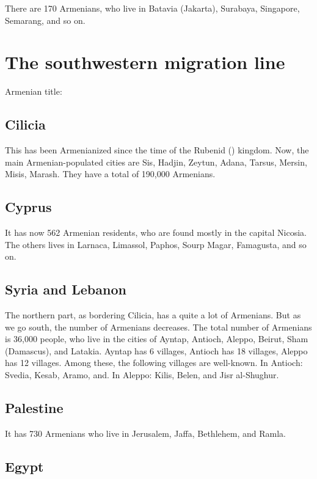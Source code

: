 There are 170 Armenians, who live in Batavia (Jakarta), Surabaya, Singapore, Semarang, and so on. 

\section{The southwestern migration line}

Armenian title: 


\subsection{Cilicia}

This has been Armenianized since the time of the Rubenid () kingdom. Now, the main Armenian-populated cities are Sis, Hadjin, Zeytun, Adana, Tarsus, Mersin, Misis, Marash. They have a total of 190,000 Armenians.

\subsection{Cyprus}

It has now 562 Armenian residents, who are found mostly in the capital Nicosia. The others lives in Larnaca, Limassol, Paphos, Sourp Magar, Famagusta, and so on. 

\subsection{Syria and Lebanon}

The northern part, as bordering Cilicia, has a quite a lot of Armenians. But as we go south, the number of Armenians decreases. The total number of Armenians is 36,000 people, who live in the cities of Ayntap, Antioch, Aleppo, Beirut, Sham (Damascus), and Latakia. Ayntap has 6 villages, Antioch has 18 villages, Aleppo has 12 villages. Among these, the following villages are well-known. In Antioch: Svedia, Kesab, Aramo, and. In Aleppo: Kilis, Belen, and Jisr al-Shughur.

\subsection{Palestine}
It has 730 Armenians who live in Jerusalem, Jaffa, Bethlehem, and Ramla. 

\subsection{Egypt}

